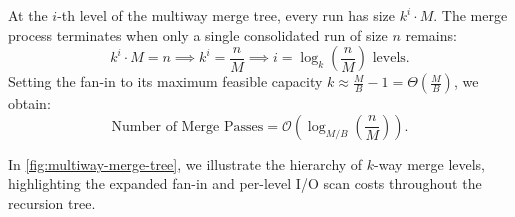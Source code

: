 At the $i$-th level of the multiway merge tree, every run has size $k^i \cdot M$. The merge process terminates when only a single consolidated run of size $n$ remains:
\begin{equation}
  k^i \cdot M = n \implies k^i = \frac{n}{M} \implies i = \log_k\left(\frac{n}{M}\right) \text{ levels}.
\end{equation}
Setting the fan-in to its maximum feasible capacity $k \approx \frac{M}{B} - 1 = \Theta\left(\frac{M}{B}\right)$, we obtain:
\begin{equation}
  \text{Number of Merge Passes} = \mathcal{O}\left(\log_{M/B}\left(\frac{n}{M}\right)\right).
\end{equation}

In \autoref{fig:multiway-merge-tree}, we illustrate the hierarchy of $k$-way merge levels, highlighting the expanded fan-in and per-level I/O scan costs throughout the recursion tree.

